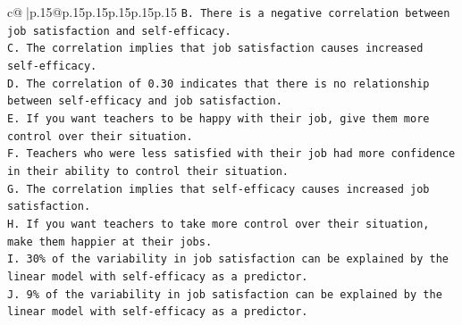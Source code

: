\documentclass{article}
\begin{document}
{\begin{supertabular}{c@{$\;$}|p{.15\linewidth}@{}p{.15\linewidth}p{.15\linewidth}p{.15\linewidth}p{.15\linewidth}p{.15\linewidth}}
{{{\texttt{B. There is a negative correlation between job satisfaction and self{-}efficacy.} \\
\texttt{C. The correlation implies that job satisfaction causes increased self{-}efficacy.} \\
\texttt{D. The correlation of 0.30 indicates that there is no relationship between self{-}efficacy and job satisfaction.} \\
\texttt{E. If you want teachers to be happy with their job, give them more control over their situation.} \\
\texttt{F. Teachers who were less satisfied with their job had more confidence in their ability to control their situation.} \\
\texttt{G. The correlation implies that self{-}efficacy causes increased job satisfaction.} \\
\texttt{H. If you want teachers to take more control over their situation, make them happier at their jobs.} \\
\texttt{I. 30\% of the variability in job satisfaction can be explained by the linear model with self{-}efficacy as a predictor.} \\
\texttt{J. 9\% of the variability in job satisfaction can be explained by the linear model with self{-}efficacy as a predictor.} \\
            }
        }
    }
     \\ \\


\end{supertabular}}
\end{document}
